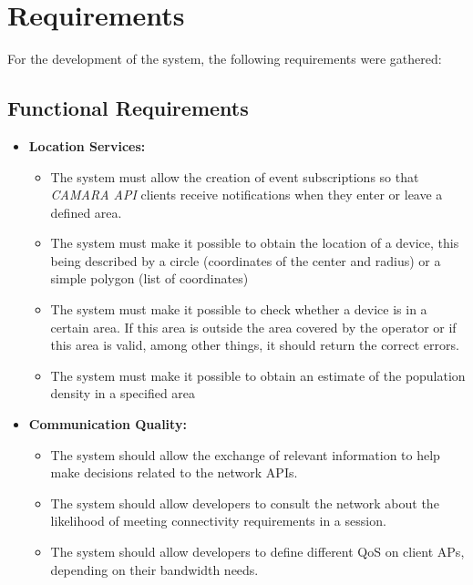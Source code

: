 \section{Requirements}

For the development of the system, the following requirements were gathered:

\subsection{Functional Requirements}

\begin{itemize}
  \item \textbf{Location Services:}
    \begin{itemize}

      \item The system must allow the creation of event subscriptions so that
        \emph{CAMARA API} clients receive notifications when they enter or leave a
        defined area.

      \item The system must make it possible to obtain the location of a
        device, this being described by a circle (coordinates of the center and
        radius) or a simple polygon (list of coordinates)

      \item The system must make it possible to check whether a device is in a
        certain area. If this area is outside the area covered by the operator
        or if this area is valid, among other things, it should return the
        correct errors.

      \item The system must make it possible to obtain an estimate of the
        population density in a specified area
    \end{itemize}

  \item \textbf{Communication Quality:}
    \begin{itemize}
      \item The system should allow the exchange of relevant information to help make
        decisions related to the network APIs.

      \item The system should allow developers to consult the network about the
        likelihood of meeting connectivity requirements in a session. 

      \item The system should allow developers to define different QoS on client APs,
        depending on their bandwidth needs.


\end{itemize}
\end{itemize}
